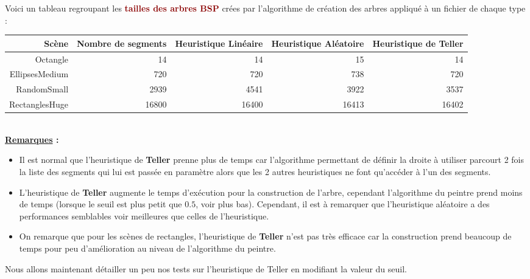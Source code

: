 \documentclass{article}
\newcommand{\dred}[1]{\textcolor{darkred}{\textbf{#1}}}
\begin{document}
\newpage
Voici un tableau regroupant les \dred{tailles des arbres BSP} crées par l'algorithme de création des arbres appliqué à un fichier de chaque type : 
\begin{center}
	\begin{tabular}{|*{5}{r|}}
	\hline
	Scène & Nombre de segments & Heuristique Linéaire & Heuristique Aléatoire & Heuristique de Teller \\
	\hline
	Octangle & 14 & 14 & 15 & 14 \\
	\hline
	EllipsesMedium & 720 & 720 & 738 & 720 \\
	\hline
	RandomSmall & 2939 & 4541 & 3922 & 3537 \\
	\hline
	RectanglesHuge & 16800 & 16400 & 16413 & 16402 \\
	\hline
	\end{tabular}
\end{center}
$ $\\
\noindent\textbf{\underline{Remarques} : } \\
\begin{itemize}
\item Il est normal que l'heuristique de \textbf{Teller} prenne plus de temps car l'algorithme permettant de définir la droite à utiliser parcourt 2 fois la liste des segments qui lui 
est passée en paramètre alors que les 2 autres heuristiques ne font qu'accéder à l'un des segments.
\item L'heuristique de \textbf{Teller} augmente le temps d'exécution pour la construction de l'arbre, cependant l'algorithme du peintre prend moins de temps (lorsque le seuil est 
plus petit que $0.5$, voir plus bas). Cependant, il est à remarquer que l'heuristique aléatoire a des performances semblables voir meilleures que celles de l'heuristique.
\item On remarque que pour les scènes de rectangles, l'heuristique de  \textbf{Teller} n'est pas très efficace car la construction prend beaucoup de temps pour peu d'amélioration 
au niveau de l'algorithme du peintre.\\
\end{itemize}

\noindent Nous allons maintenant détailler un peu nos tests sur l'heuristique de Teller en modifiant la valeur du seuil.
\end{document}
